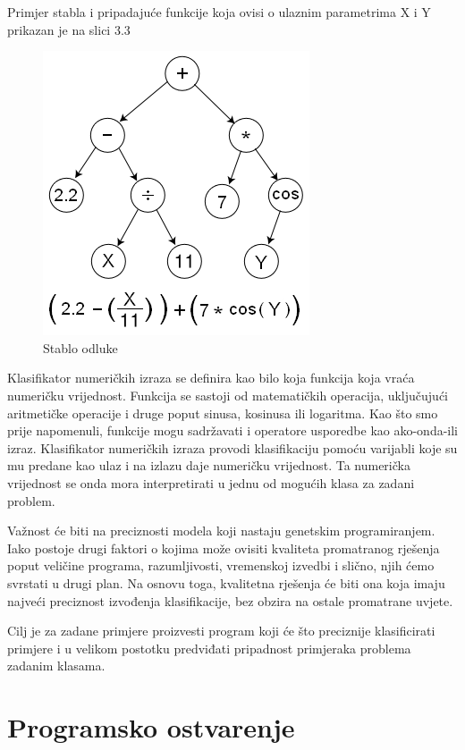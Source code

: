 \documentclass[times, utf8, zavrsni]{fer}
\begin{document}
Primjer stabla i pripadajuće funkcije koja ovisi o ulaznim parametrima X i Y prikazan je na slici 3.3

\begin{figure}[htb]
\centering
\includegraphics[scale=0.6]{images/stablo}
\caption{Stablo odluke}
\end{figure}

Klasifikator numeričkih izraza se definira kao bilo koja funkcija koja vraća numeričku vrijednost. Funkcija se sastoji od matematičkih operacija, uključujući aritmetičke operacije i druge poput sinusa, kosinusa ili logaritma. Kao što smo prije napomenuli, funkcije mogu sadržavati i operatore usporedbe kao ako-onda-ili izraz. Klasifikator numeričkih izraza provodi klasifikaciju pomoću varijabli koje su mu predane kao ulaz i na izlazu daje numeričku vrijednost. Ta numerička vrijednost se onda mora interpretirati u jednu od mogućih klasa za zadani problem.   

Važnost će biti na preciznosti modela koji nastaju genetskim programiranjem. Iako postoje drugi faktori o kojima može ovisiti kvaliteta promatranog rješenja poput veličine programa, razumljivosti, vremenskoj izvedbi i slično, njih ćemo svrstati u drugi plan. Na osnovu toga, kvalitetna rješenja će biti ona koja imaju najveći preciznost izvođenja klasifikacije, bez obzira na ostale promatrane uvjete.

Cilj je za zadane primjere proizvesti program koji će što preciznije klasificirati primjere i u velikom postotku predviđati pripadnost primjeraka problema zadanim klasama. 

\chapter{Programsko ostvarenje}
\end{document}
